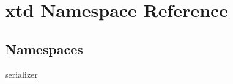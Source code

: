 \hypertarget{namespacextd}{}\section{xtd Namespace Reference}
\label{namespacextd}
\subsection*{Namespaces}
\begin{DoxyCompactItemize}
\item 
 \hyperlink{namespacextd_1_1serializer}{serializer}
\end{DoxyCompactItemize}
